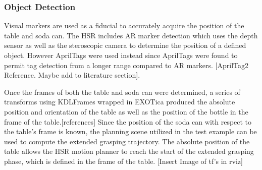 \documentclass[12pt]{article}
\begin{document}
            \subsubsection{Object Detection}
                Visual markers are used as a fiducial to accurately acquire the position of the table and soda can.
                The HSR includes AR marker detection which uses the depth sensor as well as the steroscopic camera to determine the position of a defined object. However AprilTags were used instead since AprilTags were found to permit tag detection from a longer range compared to AR markers. [AprilTag2 Reference. Maybe add to literature section]. 

                \par Once the frames of both the table and soda can were determined, a series of transforms using KDLFrames wrapped in EXOTica produced the absolute position and orientation of the table as well as the position of the bottle in the frame of the table.[references] Since the position of the soda can with respect to the table's frame is known, the planning scene utilized in the test example can be used to compute the extended grasping trajectory.
                 The absolute position of the table allows the HSR motion planner to reach the start of the extended grasping phase, which is defined in the frame of the table. [Insert Image of tf's in rviz]
\end{document}
